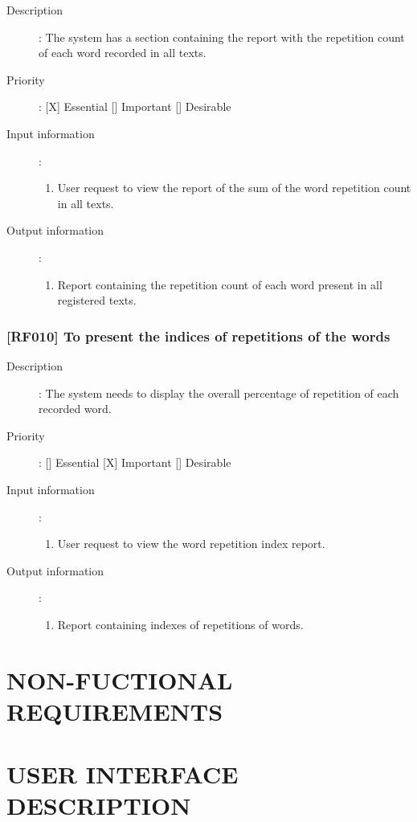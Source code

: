\documentclass[11pt, twoside, a4paper]{book}
\begin{document}
				\begin{description}
						
					\item[Description]: The system has a section containing the report with the repetition count of each word recorded in all texts.
					\item[Priority]: [X] Essential [] Important [] Desirable
					\item[Input information]:
						\begin{enumerate}

							\item User request to view the report of the sum of the word repetition count in all texts.
							
						\end{enumerate}
					\item[Output information]:
						\begin{enumerate}

							\item Report containing the repetition count of each word present in all registered texts.
																					
						\end{enumerate}
	
				\end{description}

			\subsection{[RF010] To present the indices of repetitions of the words}
				
				\begin{description}
						
					\item[Description]: The system needs to display the overall percentage of repetition of each recorded word.
					\item[Priority]: [] Essential [X] Important [] Desirable
					\item[Input information]:
						\begin{enumerate}

							\item User request to view the word repetition index report.
							
						\end{enumerate}
					\item[Output information]:
						\begin{enumerate}

							\item Report containing indexes of repetitions of words.
																					
						\end{enumerate}
	
				\end{description}
		
	\chapter{NON-FUCTIONAL REQUIREMENTS}
	
	\chapter{USER INTERFACE DESCRIPTION}
\end{document}

